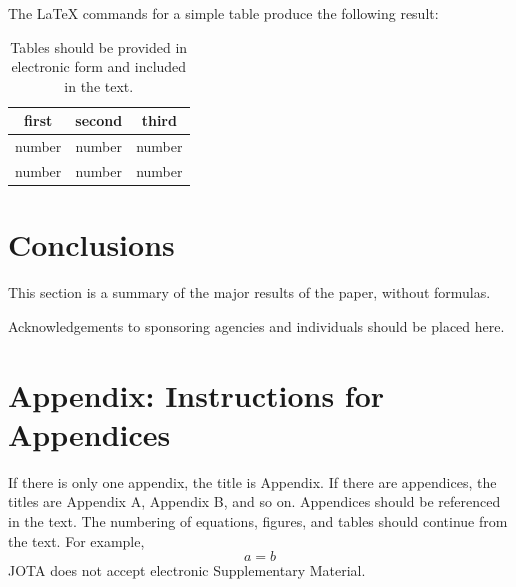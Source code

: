 \documentclass[smallextended,referee,envcountsect,]{svjour3}
\begin{document}
The LaTeX commands for a simple table produce the following result:
\begin{table}[ht]
\caption{Tables should be provided in electronic form and included in the text. }
\vspace{.1 in}
\begin{center}
\begin{tabular}{|c|c|c|}
\hline
first & second & third  \\
\hline
number & number & number \\
number & number & number \\
\hline
\end{tabular}
\end{center}
\end{table}


\section{Conclusions}


This section is a summary of the major results of the paper, without formulas.

\begin{acknowledgements}
Acknowledgements to sponsoring agencies and individuals should be placed here.
\end{acknowledgements}

\appendix  %
\section*{Appendix:  Instructions for Appendices}
If there is only one appendix, the title is Appendix. If there are appendices, the titles are Appendix A, Appendix B, and so on. Appendices should be referenced in the text. The numbering of equations,  figures, and tables should continue from the  text. For example,
\begin{equation}
a=b
\end{equation}
JOTA does not  accept electronic Supplementary Material.
\end{document}
